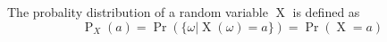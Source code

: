 The probality distribution of a random variable $\operatorname{X}$ is defined as
$$\operatorname{P}_X(a) = \operatorname{Pr}(\{\omega | \operatorname{X}(\omega) = a\}) = \operatorname{Pr}(\operatorname{X} = a)$$
